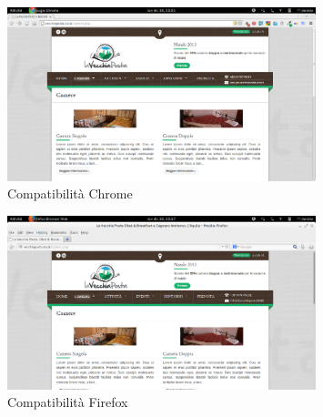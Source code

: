 \documentclass[a4paper,12pt,hidelinks]{report}
\begin{document}
\begin{figure}[h!]%
    \includegraphics[width=0.8\textwidth,keepaspectratio=true]{../img/compChrome}
    \centering
    \caption{Compatibilità Chrome}%
    \label{fig:compChrome}%
\end{figure}

\begin{figure}[h!]%
    \includegraphics[width=0.8\textwidth,keepaspectratio=true]{../img/compFirefox}
    \centering
    \caption{Compatibilità Firefox}%
    \label{fig:compFirefox}%
\end{figure}
\end{document}
